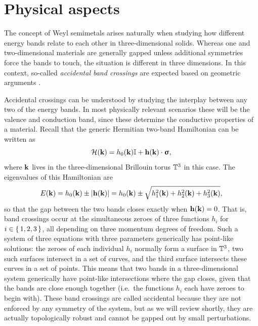 \section{Physical aspects}\label{sec:semimetal-physics}

The concept of Weyl semimetals arises naturally when studying how different energy bands relate to each other in three-dimensional solids. Whereas one and two-dimensional materials are generally gapped unless additional symmetries force the bands to touch, the situation is different in three dimensions. In this context, so-called \emph{accidental band crossings} are expected based on geometric arguments \cite{Herring_Accidental}.

Accidental crossings can be understood by studying the interplay between any two of the energy bands. In most physically relevant scenarios these will be the valence and conduction band, since these determine the conductive properties of a material. Recall that the generic Hermitian two-band Hamiltonian can be written as
\begin{equation*}
	\Hc(\k) = h_0(\k)\Id + \h(\k)\cdot\bm{\upsigma}, %
\end{equation*}
where $\vb{k}$ lives in the three-dimensional Brillouin torus $\mathbb{T}^3$ in this case. The eigenvalues of this Hamiltonian are
\begin{equation*}
	E(\vb{k}) = h_0(\vb{k}) \pm \abs{\vb{h}(\vb{k})} = h_0(\vb{k}) \pm \sqrt{h_1^2(\vb{k}) + h_2^2(\vb{k}) + h_3^2(\vb{k})},
\end{equation*}
so that the gap between the two bands closes exactly when $\vb{h}(\vb{k}) = 0$. That is, band crossings occur at the simultaneous zeroes of three functions $h_i$ for $i\in\set{1,2,3}$, all depending on three momentum degrees of freedom. Such a system of three equations with three parameters generically has point-like solutions: the zeroes of each individual $h_i$ normally form a surface in $\mathbb{T}^3$, two such surfaces intersect in a set of curves, and the third surface intersects these curves in a set of points. This means that two bands in a three-dimensional system generically have point-like intersections where the gap closes, given that the bands are close enough together (i.e.\ the functions $h_i$ each have zeroes to begin with). %
These band crossings are called accidental because they are not enforced by any symmetry of the system, but as we will review shortly, they are actually topologically robust and cannot be gapped out by small perturbations.

